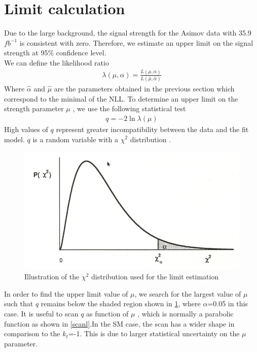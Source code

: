 \section{Limit calculation}
Due to the large background, the signal strength for the Asimov data with 35.9 $fb^{-1}$ is consistent with zero.
Therefore, we estimate an upper limit on the signal strength at 95$\%$  confidence level.\\

We can define the likelihood ratio
\begin{align}
\lambda(\mu,\alpha)=\frac{L(\mu,\alpha)}{L(\hat{\mu},\hat{\alpha})}
\end{align}
Where $\hat{\alpha}$ and $\hat{\mu}$ are the parameters obtained in the previous section which correspond to the minimal of the NLL.
To determine an upper limit on the strength parameter $\mu$ , we use the following statistical test
\begin{align}
q=  -2\ln{\lambda(\mu)} 
\end{align}
High values of $q$ represent greater incompatibility between the data and the fit model.
$q$ is a random variable with a $\chi^2$ distribution \cite{asimov}.


\begin{figure}[ht!]
	\centering
	\includegraphics[scale=0.5]{Chapter4/chi_squared.png}
	\caption{Illustration of the $\chi^2$ distribution used for the limit estimation}
\label{chi}
\end{figure}
 
In order to find the upper limit value of $\mu$, we search for the largest value of $\mu$  such that $q$ remains below the shaded region shown in \ref{chi}, where $\alpha$=0.05 in this case. 
It is useful to scan $q$ as function of $\mu$ , which is normally a parabolic function as shown in \ref{scanl}.In the SM case, the scan has a wider shape in comparison to the $k_t$=-1. This is due to larger statistical uncertainty on the $\mu$ parameter. \\


